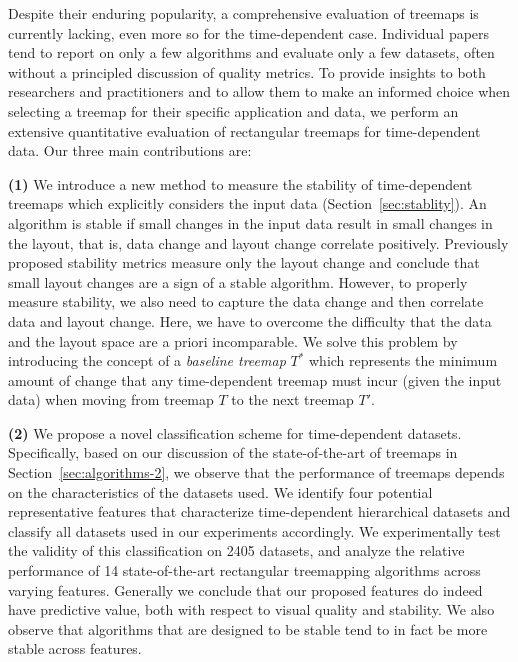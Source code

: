 
 Despite their enduring popularity, a comprehensive evaluation of treemaps is currently lacking, even more so for the time-dependent case. Individual papers tend to report on only a few algorithms and evaluate only a few datasets, often without a principled discussion of quality metrics. To provide insights to both researchers and practitioners and to allow them to make an informed choice when selecting a treemap for their specific application and data, we perform an extensive quantitative evaluation of rectangular treemaps for time-dependent data. Our three main contributions are:

\noindent
\textbf{(1)} We introduce a new method to measure the stability of time-dependent treemaps which explicitly considers the input data (Section~\ref{sec:stablity}). An algorithm is stable if small changes in the input data result in small changes in the layout, that is, data change and layout change correlate positively. Previously proposed stability metrics measure only the layout change and conclude that small layout changes are a sign of a stable algorithm. However, to properly measure stability, we also need to capture the data change and then correlate data and layout change. Here, we have to
overcome the difficulty that the data and the layout space are a priori incomparable. We solve this problem by introducing the concept of a \emph{baseline treemap} $T^*$ which represents the minimum amount of change that any time-dependent treemap must incur (given the input data) when moving from treemap $T$ to the next treemap $T'$.

\noindent
\textbf{(2)} We propose a novel classification scheme for time-dependent datasets. Specifically, based on our discussion of the state-of-the-art of treemaps in Section~\ref{sec:algorithms-2}, we observe that the performance of treemaps depends on the characteristics of the datasets used. We identify four potential representative features that characterize time-dependent hierarchical datasets and classify all datasets used in our experiments accordingly. We experimentally test the validity of this classification on 2405 datasets, and analyze the relative performance of 14 state-of-the-art rectangular treemapping algorithms across varying features. Generally we conclude that our proposed features do indeed have predictive value, both with respect to visual quality and stability. We also observe that algorithms that are designed to be stable tend to in fact be more stable across features.

